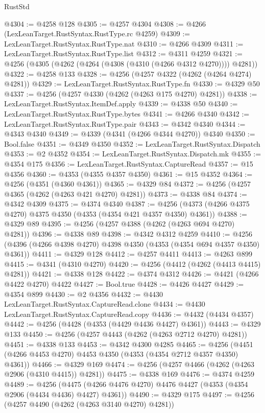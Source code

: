 \begin{lexlean}{RustStd}
\begin{coremodule}
@4304 := @4258 @128
@4305 := @4257 @4304
@4308 := @4266 (LexLeanTarget.RustSyntax.RustType.rc @4259)
@4309 := LexLeanTarget.RustSyntax.RustType.nat
@4310 := @4266 @4309
@4311 := LexLeanTarget.RustSyntax.RustType.list
@4312 := @4311 @4259
@4321 := @4256 (@4305 (@4262 (@4264 (@4308 (@4310 (@4266 @4312 @4270)))) @4281))
@4322 := @4258 @133
@4328 := @4256 (@4257 @4322 (@4262 (@4264 @4274) @4281))
@4329 := LexLeanTarget.RustSyntax.RustType.fn
@4330 := @4329 @50
@4337 := @4256 (@4257 @4330 (@4262 (@4263 @175 @4270) @4281))
@4338 := LexLeanTarget.RustSyntax.ItemDef.apply
@4339 := @4338 @50
@4340 := LexLeanTarget.RustSyntax.RustType.bytes
@4341 := @4266 @4340
@4342 := LexLeanTarget.RustSyntax.RustType.pair
@4343 := @4342 @4340
@4344 := @4343 @4340
@4349 := @4339 (@4341 (@4266 @4344 @4270)) @4340
@4350 := Bool.false
@4351 := @4349 @4350
@4352 := LexLeanTarget.RustSyntax.Dispatch
@4353 := @2 @4352
@4354 := LexLeanTarget.RustSyntax.Dispatch.mk
@4355 := @4354 @175
@4356 := LexLeanTarget.RustSyntax.CaptureRead
@4357 := @15 @4356
@4360 := @4353 (@4355 @4357 @4350)
@4361 := @15 @4352
@4364 := @4256 (@4351 (@4360 @4361))
@4365 := @4329 @84
@4372 := @4256 (@4257 @4365 (@4262 (@4263 @421 @4270) @4281))
@4373 := @4338 @84
@4374 := @4342 @4309
@4375 := @4374 @4340
@4387 := @4256 (@4373 (@4266 @4375 @4270) @4375 @4350 (@4353 (@4354 @421 @4357 @4350) @4361))
@4388 := @4329 @89
@4395 := @4256 (@4257 @4388 (@4262 (@4263 @694 @4270) @4281))
@4396 := @4338 @89
@4398 := @4342 @4312 @4259
@4410 := @4256 (@4396 (@4266 @4398 @4270) @4398 @4350 (@4353 (@4354 @694 @4357 @4350) @4361))
@4411 := @4329 @128
@4412 := @4257 @4411
@4413 := @4263 @899
@4415 := @4341 (@4310 @4270)
@4420 := @4256 (@4412 (@4262 (@4413 @4415) @4281))
@4421 := @4338 @128
@4422 := @4374 @4312
@4426 := @4421 (@4266 @4422 @4270) @4422
@4427 := Bool.true
@4428 := @4426 @4427
@4429 := @4354 @899
@4430 := @2 @4356
@4432 := @4430 LexLeanTarget.RustSyntax.CaptureRead.clone
@4434 := @4430 LexLeanTarget.RustSyntax.CaptureRead.copy
@4436 := @4432 (@4434 @4357)
@4442 := @4256 (@4428 (@4353 (@4429 @4436 @4427) @4361))
@4443 := @4329 @133
@4450 := @4256 (@4257 @4443 (@4262 (@4263 @2712 @4270) @4281))
@4451 := @4338 @133
@4453 := @4342 @4300 @4285
@4465 := @4256 (@4451 (@4266 @4453 @4270) @4453 @4350 (@4353 (@4354 @2712 @4357 @4350) @4361))
@4466 := @4329 @169
@4474 := @4256 (@4257 @4466 (@4262 (@4263 @2906 (@4310 @4415)) @4281))
@4475 := @4338 @169
@4476 := @4374 @4259
@4489 := @4256
    (@4475 (@4266 @4476 @4270) @4476 @4427 (@4353 (@4354 @2906 (@4434 @4436) @4427) @4361))
@4490 := @4329 @175
@4497 := @4256 (@4257 @4490 (@4262 (@4263 @3140 @4270) @4281))

\end{coremodule}
\end{lexlean}
